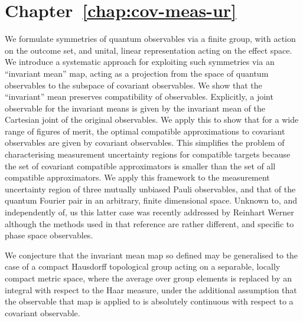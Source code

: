 \section*{Chapter~\ref{chap:cov-meas-ur}}

We formulate symmetries of quantum observables via a finite group, with action on the outcome set, and unital, linear representation acting on the effect space. We introduce a systematic approach for exploiting such symmetries via an ``invariant mean'' map, acting as a projection from the space of quantum observables to the subspace of covariant observables. We show that the ``invariant'' mean preserves compatibility of observables. Explicitly, a joint observable for the invariant means is given by the invariant mean of the Cartesian joint of the original observables. We apply this to show that for a wide range of figures of merit, the optimal compatible approximations to covariant observables are given by covariant observables. This simplifies the problem of characterising measurement uncertainty regions for compatible targets because the set of covariant compatible approximators is smaller than the set of all compatible approximators. We apply this framework to the measurement uncertainty region of three mutually unbiased Pauli observables, and that of the quantum Fourier pair in an arbitrary, finite dimensional space. Unknown to, and independently of, us this latter case was recently addressed by Reinhart Werner~\cite{Werner2016} although the methods used in that reference are rather different, and specific to phase space observables.

We conjecture that the invariant mean map so defined may be generalised to the case of a compact Hausdorff topological group acting on a separable, locally compact metric space, where the average over group elements is replaced by an integral with respect to the Haar measure, under the additional assumption that the observable that map is applied to is absolutely continuous with respect to a covariant observable.
